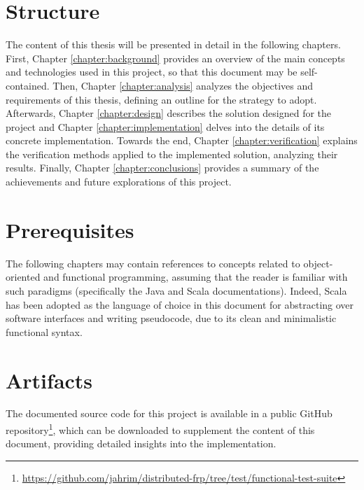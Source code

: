 \section{Structure}
\label{section:introduction:structure}

The content of this thesis will be presented in detail in the following
chapters. First, Chapter \ref{chapter:background} provides an overview of the
main concepts and technologies used in this project, so that this document may
be self-contained. Then, Chapter \ref{chapter:analysis} analyzes the objectives
and requirements of this thesis, defining an outline for the strategy to adopt.
Afterwards, Chapter \ref{chapter:design} describes the solution designed for
the project and Chapter \ref{chapter:implementation} delves into the details of
its concrete implementation. Towards the end, Chapter
\ref{chapter:verification} explains the verification methods applied to the
implemented solution, analyzing their results. Finally, Chapter
\ref{chapter:conclusions} provides a summary of the achievements and future
explorations of this project.

\section{Prerequisites}
\label{section:introduction:prerequisites}

The following chapters may contain references to concepts related to
object-orient\-ed and functional programming, assuming that the reader is
familiar with such paradigms (specifically the Java \cite{Java} and Scala
\cite{Scala} documentations). Indeed, Scala has been adopted as the language of
choice in this document for abstracting over software interfaces and writing
pseudocode, due to its clean and minimalistic functional syntax.

\section{Artifacts}
\label{section:introduction:artifacts}

The documented source code for this project is available in a public GitHub
repository\footnote{\url{https://github.com/jahrim/distributed-frp/tree/test/functional-test-suite}},
which can be downloaded to supplement the content of this document, providing
detailed insights into the implementation.